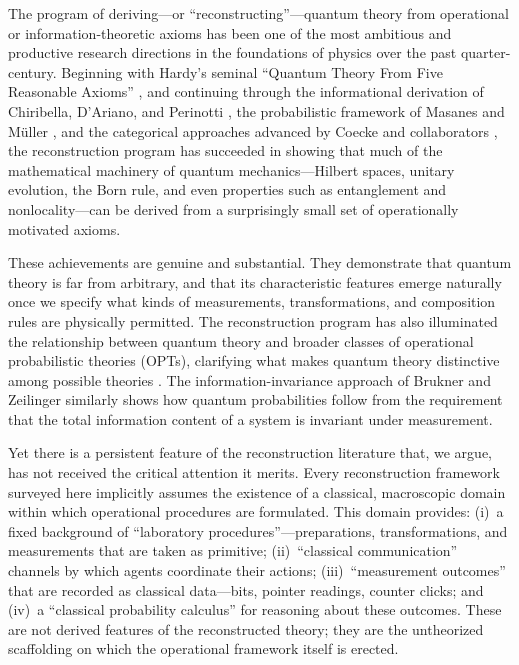 \documentclass[pdflatex,sn-mathphys-num]{sn-jnl}%
\begin{document}
The program of deriving---or ``reconstructing''---quantum theory from operational or information-theoretic axioms has been one of the most ambitious and productive research directions in the foundations of physics over the past quarter-century. Beginning with Hardy's seminal ``Quantum Theory From Five Reasonable Axioms'' \cite{Hardy2001}, and continuing through the informational derivation of Chiribella, D'Ariano, and Perinotti \cite{Chiribella2011,DAriano2017}, the probabilistic framework of Masanes and M\"{u}ller \cite{Masanes2011}, and the categorical approaches advanced by Coecke and collaborators \cite{Coecke2010,Selby2021}, the reconstruction program has succeeded in showing that much of the mathematical machinery of quantum mechanics---Hilbert spaces, unitary evolution, the Born rule, and even properties such as entanglement and nonlocality---can be derived from a surprisingly small set of operationally motivated axioms.

These achievements are genuine and substantial. They demonstrate that quantum theory is far from arbitrary, and that its characteristic features emerge naturally once we specify what kinds of measurements, transformations, and composition rules are physically permitted. The reconstruction program has also illuminated the relationship between quantum theory and broader classes of operational probabilistic theories (OPTs), clarifying what makes quantum theory distinctive among possible theories \cite{Barrett2007,Barnum2007}. The information-invariance approach of Brukner and Zeilinger \cite{Brukner2009} similarly shows how quantum probabilities follow from the requirement that the total information content of a system is invariant under measurement.

Yet there is a persistent feature of the reconstruction literature that, we argue, has not received the critical attention it merits. Every reconstruction framework surveyed here implicitly assumes the existence of a classical, macroscopic domain within which operational procedures are formulated. This domain provides: (i)~a fixed background of ``laboratory procedures''---preparations, transformations, and measurements that are taken as primitive; (ii)~``classical communication'' channels by which agents coordinate their actions; (iii)~``measurement outcomes'' that are recorded as classical data---bits, pointer readings, counter clicks; and (iv)~a ``classical probability calculus'' for reasoning about these outcomes. These are not derived features of the reconstructed theory; they are the untheorized scaffolding on which the operational framework itself is erected.
\end{document}
